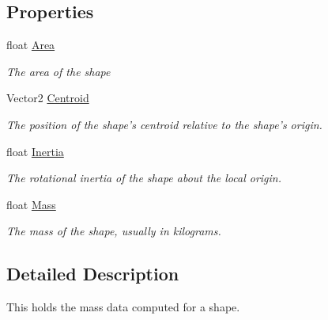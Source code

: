 \subsection*{Properties}
\begin{DoxyCompactItemize}
\item 
float \hyperlink{struct_farseer_physics_1_1_collision_1_1_shapes_1_1_mass_data_a12c80c29e4f453f8dba95e6a9e415459}{Area}
\begin{DoxyCompactList}\small\item\em The area of the shape \end{DoxyCompactList}\item 
Vector2 \hyperlink{struct_farseer_physics_1_1_collision_1_1_shapes_1_1_mass_data_a4393379c8a679569912715fda42bbe65}{Centroid}
\begin{DoxyCompactList}\small\item\em The position of the shape's centroid relative to the shape's origin. \end{DoxyCompactList}\item 
float \hyperlink{struct_farseer_physics_1_1_collision_1_1_shapes_1_1_mass_data_a2137b2a60ea838ed57bca3025281d5d0}{Inertia}
\begin{DoxyCompactList}\small\item\em The rotational inertia of the shape about the local origin. \end{DoxyCompactList}\item 
float \hyperlink{struct_farseer_physics_1_1_collision_1_1_shapes_1_1_mass_data_acbb6b19c8cf9c778e7fd09693cb53895}{Mass}
\begin{DoxyCompactList}\small\item\em The mass of the shape, usually in kilograms. \end{DoxyCompactList}\end{DoxyCompactItemize}


\subsection{Detailed Description}
This holds the mass data computed for a shape. 



